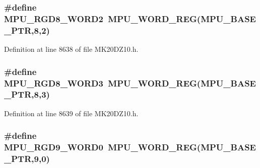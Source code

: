 \subsubsection[{\texorpdfstring{M\+P\+U\+\_\+\+R\+G\+D8\+\_\+\+W\+O\+R\+D2}{MPU_RGD8_WORD2}}]{\setlength{\rightskip}{0pt plus 5cm}\#define M\+P\+U\+\_\+\+R\+G\+D8\+\_\+\+W\+O\+R\+D2~{\bf M\+P\+U\+\_\+\+W\+O\+R\+D\+\_\+\+R\+EG}({\bf M\+P\+U\+\_\+\+B\+A\+S\+E\+\_\+\+P\+TR},8,2)}\hypertarget{group___m_p_u___register___accessor___macros_ga84f84af37f2bd5663e8ce1e3dbf4c519}{}\label{group___m_p_u___register___accessor___macros_ga84f84af37f2bd5663e8ce1e3dbf4c519}


Definition at line 8638 of file M\+K20\+D\+Z10.\+h.

\subsubsection[{\texorpdfstring{M\+P\+U\+\_\+\+R\+G\+D8\+\_\+\+W\+O\+R\+D3}{MPU_RGD8_WORD3}}]{\setlength{\rightskip}{0pt plus 5cm}\#define M\+P\+U\+\_\+\+R\+G\+D8\+\_\+\+W\+O\+R\+D3~{\bf M\+P\+U\+\_\+\+W\+O\+R\+D\+\_\+\+R\+EG}({\bf M\+P\+U\+\_\+\+B\+A\+S\+E\+\_\+\+P\+TR},8,3)}\hypertarget{group___m_p_u___register___accessor___macros_ga0368f44f59dd6ed39ec25cd9555277e2}{}\label{group___m_p_u___register___accessor___macros_ga0368f44f59dd6ed39ec25cd9555277e2}


Definition at line 8639 of file M\+K20\+D\+Z10.\+h.

\subsubsection[{\texorpdfstring{M\+P\+U\+\_\+\+R\+G\+D9\+\_\+\+W\+O\+R\+D0}{MPU_RGD9_WORD0}}]{\setlength{\rightskip}{0pt plus 5cm}\#define M\+P\+U\+\_\+\+R\+G\+D9\+\_\+\+W\+O\+R\+D0~{\bf M\+P\+U\+\_\+\+W\+O\+R\+D\+\_\+\+R\+EG}({\bf M\+P\+U\+\_\+\+B\+A\+S\+E\+\_\+\+P\+TR},9,0)}\hypertarget{group___m_p_u___register___accessor___macros_ga45cf4555557fc2548f4331619eb6500b}{}\label{group___m_p_u___register___accessor___macros_ga45cf4555557fc2548f4331619eb6500b}


